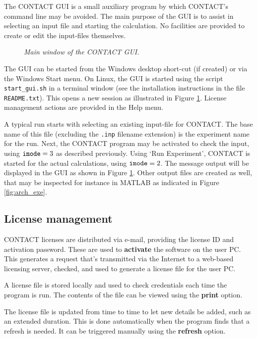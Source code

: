 \documentclass[12pt]{report}
\begin{document}
The CONTACT GUI is a small auxiliary program by which CONTACT's command
line may be avoided. The main purpose of the GUI is to assist in selecting
an input file and starting the calculation. No facilities are provided to
create or edit the input-files themselves.

\begin{figure}[bt]
\centering
{}
\caption{\em Main window of the CONTACT GUI.}
\label{fig:screenshot_gui}
\end{figure}

The GUI can be started from the Windows desktop short-cut (if created) or
via the Windows Start menu. On Linux, the GUI is started using the script
{\tt start\_gui.sh} in a terminal window (see the installation instructions
in the file {\tt README.txt}). This opens a new session as illustrated in
Figure \ref{fig:screenshot_gui}. License management actions are provided in
the Help menu.

A typical run starts with selecting an existing input-file for CONTACT.
The base name of this file (excluding the {\tt .inp} filename extension) is
the experiment name for the run. Next, the CONTACT program may be activated
to check the input, using ${\tt imode}=3$ as described previously. Using
`Run Experiment', CONTACT is started for the actual calculations, using
${\tt imode}=2$. The message output will be displayed in the GUI as shown
in Figure \ref{fig:screenshot_gui}. Other output files are created as
well, that may be inspected for instance in MATLAB as indicated in
Figure \ref{fig:arch_exe}.

\subsection{License management}
\label{sec:license_mngmt}

CONTACT licenses are distributed via e-mail, providing the license ID
and activation password. These are used to {\bf activate} the software on
the user PC. This generates a request that's transmitted via the Internet
to a web-based licensing server, checked, and used to generate a license
file for the user PC. 

A license file is stored locally and used to check credentials each
time the program is run. The contents of the file can be viewed using the
{\bf print} option.

The license file is updated from time to time to let new details be added,
such as an extended duration. This is done automatically when the program
finds that a refresh is needed. It can be triggered manually using the {\bf
refresh} option.
\end{document}
